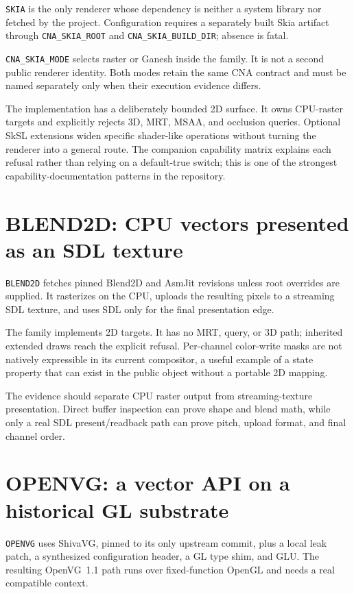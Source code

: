 \texttt{SKIA} is the only renderer whose dependency is neither a system library nor fetched by
the project.  Configuration requires a separately built Skia artifact through
\texttt{CNA\_SKIA\_ROOT} and \texttt{CNA\_SKIA\_BUILD\_DIR}; absence is fatal.

\texttt{CNA\_SKIA\_MODE} selects raster or Ganesh inside the family.  It is not a second public
renderer identity.  Both modes retain the same CNA contract and must be named separately only
when their execution evidence differs.

The implementation has a deliberately bounded 2D surface.  It owns CPU-raster targets and
explicitly rejects 3D, MRT, MSAA, and occlusion queries.  Optional SkSL extensions widen
specific shader-like operations without turning the renderer into a general
 route.  The companion capability matrix explains each refusal rather
than relying on a default-true switch; this is one of the strongest capability-documentation
patterns in the repository.

\section{BLEND2D: CPU vectors presented as an SDL texture}

\texttt{BLEND2D} fetches pinned Blend2D and AsmJit revisions unless root overrides are supplied.
It rasterizes on the CPU, uploads the resulting pixels to a streaming SDL texture, and uses SDL
only for the final presentation edge.

The family implements 2D targets.  It has no MRT, query, or 3D path; inherited extended draws
reach the explicit refusal.  Per-channel color-write masks are not natively expressible in its
current compositor, a useful example of a state property that can exist in the public object
without a portable 2D mapping.

The evidence should separate CPU raster output from streaming-texture presentation.  Direct
buffer inspection can prove shape and blend math, while only a real SDL present/readback path
can prove pitch, upload format, and final channel order.

\section{OPENVG: a vector API on a historical GL substrate}

\texttt{OPENVG} uses ShivaVG, pinned to its only upstream commit, plus a local leak patch, a
synthesized configuration header, a GL type shim, and GLU.  The resulting OpenVG~1.1 path runs
over fixed-function OpenGL and needs a real compatible context.

